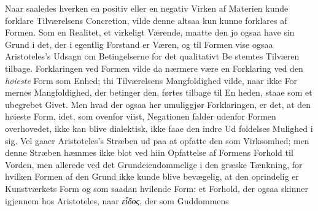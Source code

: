 \documentclass[12pt,a4paper]{book}
\newcommand{\gk}[1]{\textit{#1}}
\begin{document}
Naar saaledes hverken en positiv eller en negativ Virken
af Materien kunde forklare Tilværelsens Concretion, vilde denne
altsaa kun kunne forklares af Formen. Som en Realitet, et
virkeligt Værende, maatte den jo ogsaa have sin Grund i det,
der i egentlig Forstand er Væren, og til Formen vise ogsaa
Aristoteles's Udsagn om Betingelserne for det qualitativt Be\-%
stemtes Tilværen tilbage. Forklaringen ved Formen vilde da
nærmere være en Forklaring ved den \emph{høieste} Form som
Enhed; thi Tilværelsens Mangfoldighed vilde, naar ikke For\-%
mernes Mangfoldighed, der betinger den, førtes tilbage til En\-%
heden, staae som et ubegrebet Givet. Men hvad der ogsaa
her umuliggjør Forklaringen, er det, at den høieste Form,
idet, som ovenfor viist, Negationen falder udenfor Formen
overhovedet, ikke kan blive dialektisk, ikke faae den indre Ud\-%
foldelses Mulighed i sig. Vel gaaer Aristoteles's Stræben ud
paa at opfatte den som Virksomhed; men denne Stræben
hæmmes ikke blot ved hiin Opfattelse af Formens Forhold til
Vorden, men allerede ved det Grundeiendommelige i den
græske Tænkning, for hvilken Formen af den Grund ikke
kunde blive bevægelig, at den oprindelig er Kunstværkets Form
og som saadan hvilende Form: et Forhold, der ogsaa skinner
igjennem hos Aristoteles, naar \gk{εἶδος}, der som Guddommens
\end{document}
